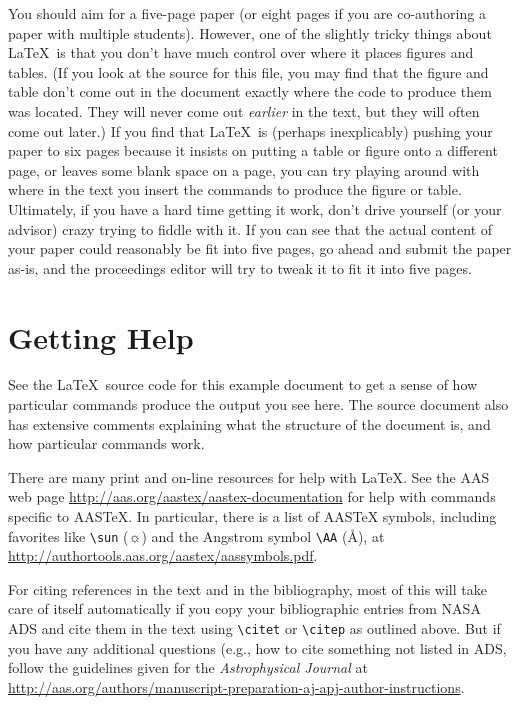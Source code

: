 \documentclass{knac}
\begin{document}
You should aim for a five-page paper (or eight pages if you are
co-authoring a paper with multiple students).  However, one of the
slightly tricky things about \LaTeX\ is that you don't have much
control over where it places figures and tables. (If you look at the
source for this file, you may find that the figure and table don't
come out in the document exactly where the code to produce them was
located.  They will never come out {\em earlier} in the text, but they
will often come out later.)  If you find that \LaTeX\ is (perhaps
inexplicably) pushing your paper to six pages because it insists on
putting a table or figure onto a different page, or leaves some blank
space on a page, you can try playing around with where in the text you
insert the commands to produce the figure or table.  Ultimately, if
you have a hard time getting it work, don't drive yourself (or your
advisor) crazy trying to fiddle with it.  If you can see that the
actual content of your paper could reasonably be fit into five pages,
go ahead and submit the paper as-is, and the proceedings editor will
try to tweak it to fit it into five pages.

\section{Getting Help}

See the \LaTeX\ source code for this example document to get a sense
of how particular commands produce the output you see here.  The
source document also has extensive comments explaining what the
structure of the document is, and how particular commands work.

There are many print and on-line resources for help with \LaTeX.  See
the AAS web page \url{http://aas.org/aastex/aastex-documentation} for
help with commands specific to AASTeX.  In particular, there is a list
of AASTeX symbols, including favorites like \verb|\sun| ($\sun$) and
the Angstrom symbol \verb|\AA| (\AA), at
\url{http://authortools.aas.org/aastex/aassymbols.pdf}.

For citing references in the text and in the bibliography, most of
this will take care of itself automatically if you copy your
bibliographic entries from NASA ADS and cite them in the text using
\verb|\citet| or \verb|\citep| as outlined above.  But if you have any
additional questions (e.g., how to cite something not listed in ADS,
follow the guidelines given for the {\it Astrophysical Journal}\/ at
\url{http://aas.org/authors/manuscript-preparation-aj-apj-author-instructions}.
\end{document}

